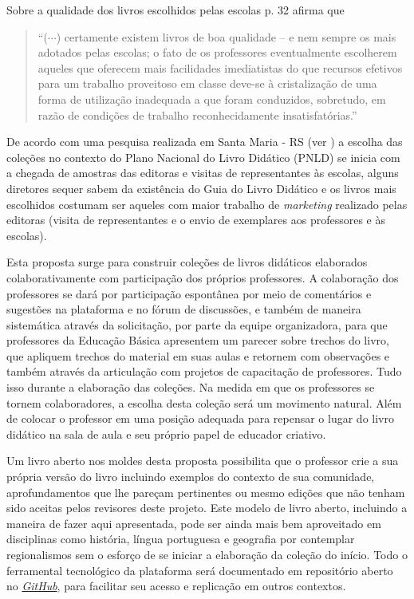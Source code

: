 \documentclass[10 pt]{article}
\begin{document}
Sobre a qualidade dos livros escolhidos pelas escolas \cite{machado} p. 32 afirma que
\blockquote{``($\cdots$) certamente existem livros de boa qualidade -- e nem sempre os mais adotados pelas escolas; o fato de os professores eventualmente escolherem aqueles que oferecem mais facilidades imediatistas do que recursos efetivos para um trabalho proveitoso em classe deve-se à cristalização de uma forma de utilização inadequada a que foram conduzidos, sobretudo, em razão de condições de trabalho reconhecidamente insatisfatórias.''}

De acordo com uma pesquisa realizada em Santa Maria - RS (ver \cite{zambon}) a escolha das coleções no contexto do Plano Nacional do Livro Didático (PNLD) se inicia com a chegada de amostras das editoras e visitas de representantes às escolas, alguns diretores sequer sabem da existência do Guia do Livro Didático e os livros mais escolhidos costumam ser aqueles com maior trabalho de {\it marketing} realizado pelas editoras (visita de representantes e o envio de exemplares aos professores e às escolas).

Esta proposta surge para construir coleções de livros didáticos elaborados colaborativamente com participação dos próprios professores.
A colaboração dos professores se dará por participação espontânea por meio de comentários e sugestões na plataforma e no fórum de discussões, e também de maneira sistemática através da solicitação, por parte da equipe organizadora, para que professores da Educação Básica apresentem um parecer sobre trechos do livro, que apliquem trechos do material em suas aulas e retornem com observações e também através da articulação com projetos de capacitação de professores.
Tudo isso durante a elaboração das coleções.
Na medida em que os professores se tornem colaboradores, a escolha desta coleção será um movimento natural.
Além de colocar o professor em uma posição adequada para repensar o lugar do livro didático na sala de aula e seu próprio papel de educador criativo.

Um livro aberto nos moldes desta proposta possibilita que o professor crie a sua própria versão do livro incluindo exemplos do contexto de sua comunidade, aprofundamentos que lhe pareçam pertinentes ou mesmo edições que não tenham sido aceitas pelos revisores deste projeto.
Este modelo de livro aberto, incluindo a maneira de fazer aqui apresentada, pode ser ainda mais bem aproveitado em disciplinas como história, língua portuguesa e geografia por contemplar regionalismos sem o esforço de se iniciar a elaboração da coleção do início.
Todo o ferramental tecnológico da plataforma será documentado em repositório aberto no {\it \href{https://github.com/simas0/Livro-Aberto-de-Matematica-texto-do-projeto-}{GitHub}}, para facilitar seu acesso e replicação em outros contextos.
\end{document}
